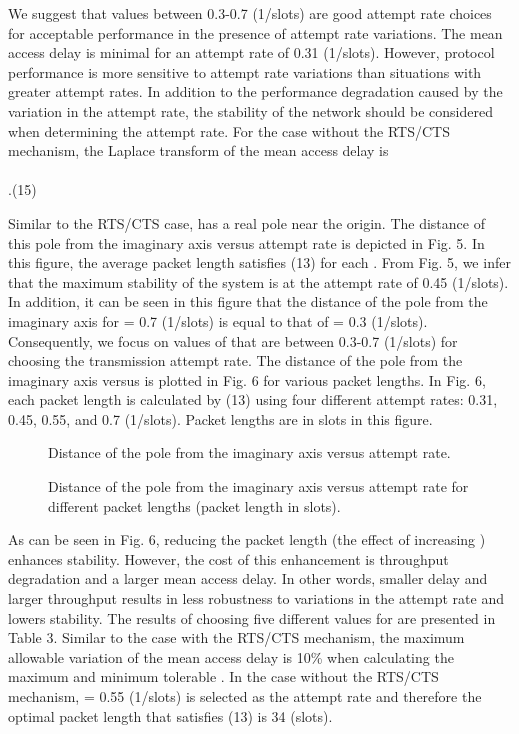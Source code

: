 \documentclass[10pt,twocolumn,oneside,submit]{JCNtran}
\begin{document}
We suggest that values between 0.3-0.7 (1/slots) are good attempt rate choices for acceptable performance in the presence of attempt rate variations. The mean access delay is minimal for an attempt rate of 0.31 (1/slots). However, protocol performance is more sensitive to attempt rate variations than situations with greater attempt rates.
In addition to the performance degradation caused by the variation in the attempt rate, the stability of the network should be considered when determining the attempt rate. For the case without the RTS/CTS mechanism, the Laplace transform of the mean access delay is\\
\\
.\hfill(15) \\
\par Similar to the RTS/CTS case,  has a real pole near the origin. The distance of this pole from the imaginary axis versus attempt rate is depicted in Fig. 5. In this figure, the average packet length satisfies (13) for each . From Fig. 5, we infer that the maximum stability of the system is at the attempt rate of 0.45 (1/slots). In addition, it can be seen in this figure that the distance of the pole from the imaginary axis for  = 0.7 (1/slots) is equal to that of  = 0.3 (1/slots). Consequently, we focus on values of  that are between 0.3-0.7 (1/slots) for choosing the transmission attempt rate. The distance of the pole from the imaginary axis versus  is plotted in Fig. 6 for various packet lengths. In Fig. 6, each packet length is calculated by (13) using four different attempt rates: 0.31, 0.45, 0.55, and 0.7 (1/slots). Packet lengths are in slots in this figure.
\begin{figure}[h!tb]
\begin{center}
\epsfxsize=8cm \leavevmode{} \caption{Distance of the pole from the imaginary axis versus attempt rate.} \label{fig:5}
\end{center}
\end{figure}
\begin{figure}[h!tb]
\begin{center}
\epsfxsize=8cm \leavevmode{} \caption{Distance of the pole from the imaginary axis versus attempt rate for different packet lengths (packet length in slots).} \label{fig:6}
\end{center}
\end{figure}
\par As can be seen in Fig. 6, reducing the packet length (the effect of increasing ) enhances stability. However, the cost of this enhancement is throughput degradation and a larger mean access delay. In other words, smaller delay and larger throughput results in less robustness to variations in the attempt rate and lowers stability. The results of choosing five different values for  are presented in Table 3. Similar to the case with the RTS/CTS mechanism, the maximum allowable variation of the mean access delay is 10\% when calculating the maximum and minimum tolerable . In the case without the RTS/CTS mechanism,  = 0.55 (1/slots) is selected as the attempt rate and therefore the optimal packet length that satisfies (13) is 34 (slots).
\end{document}
